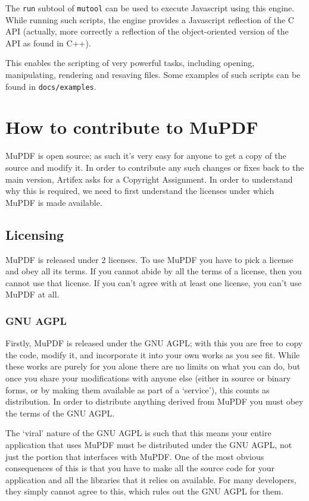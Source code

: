 \documentclass[oneside]{book}
\begin{document}
The \texttt{run} subtool of \texttt{mutool} can be used to execute Javascript using this engine. While running such scripts, the engine provides a Javascript reflection of the C API (actually, more correctly a reflection of the object-oriented version of the API as found in C++).

This enables the scripting of very powerful tasks, including opening, manipulating, rendering and resaving files. Some examples of such scripts can be found in \texttt{docs/examples}.

\appendix

\chapter{How to contribute to MuPDF}

MuPDF is open source; as such it's very easy for anyone to get a copy of the source and modify it. In order to contribute any such changes or fixes back to the main version, Artifex asks for a Copyright Assignment. In order to understand why this is required, we need to first understand the licenses under which MuPDF is made available.

\section{Licensing}

MuPDF is released under 2 licenses. To use MuPDF you have to pick a license and obey all its terms. If you cannot abide by all the terms of a license, then you cannot use that license. If you can't agree with at least one license, you can't use MuPDF at all.

\subsection{GNU AGPL}

Firstly, MuPDF is released under the GNU AGPL; with this you are free to copy the code, modify it, and incorporate it into your own works as you see fit. While these works are purely for you alone there are no limits on what you can do, but once you share your modifications with anyone else (either in source or binary forms, or by making them available as part of a `service'), this counts as distribution. In order to distribute anything derived from MuPDF you must obey the terms of the GNU AGPL. 

The `viral' nature of the GNU AGPL is such that this means your entire application that uses MuPDF must be distributed under the GNU AGPL, not just the portion that interfaces with MuPDF. One of the most obvious consequences of this is that you have to make all the source code for your application and all the libraries that it relies on available. For many developers, they simply cannot agree to this, which rules out the GNU AGPL for them.
\end{document}

